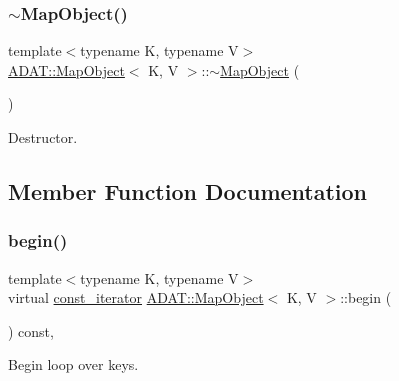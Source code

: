\subsubsection{\texorpdfstring{$\sim$MapObject()}{~MapObject()}\hspace{0.1cm}{\footnotesize\ttfamily [2/2]}}
{\footnotesize\ttfamily template$<$typename K, typename V$>$ \\
\mbox{\hyperlink{classADAT_1_1MapObject}{A\+D\+A\+T\+::\+Map\+Object}}$<$ K, V $>$\+::$\sim$\mbox{\hyperlink{classADAT_1_1MapObject}{Map\+Object}} (\begin{DoxyParamCaption}{ }\end{DoxyParamCaption})\hspace{0.3cm}{\ttfamily [inline]}}



Destructor. 



\subsection{Member Function Documentation}
\mbox{\label{classADAT_1_1MapObject_a7f4f6830f0efcc2fcd7bb2aebe0b0c95}} 
\subsubsection{\texorpdfstring{begin()}{begin()}\hspace{0.1cm}{\footnotesize\ttfamily [1/2]}}
{\footnotesize\ttfamily template$<$typename K, typename V$>$ \\
virtual \mbox{\hyperlink{classADAT_1_1MapObject_a4622cd7d3b6fed18fe226d28091cc6c8}{const\+\_\+iterator}} \mbox{\hyperlink{classADAT_1_1MapObject}{A\+D\+A\+T\+::\+Map\+Object}}$<$ K, V $>$\+::begin (\begin{DoxyParamCaption}{ }\end{DoxyParamCaption}) const\hspace{0.3cm}{\ttfamily [inline]}, {\ttfamily [virtual]}}



Begin loop over keys. 

